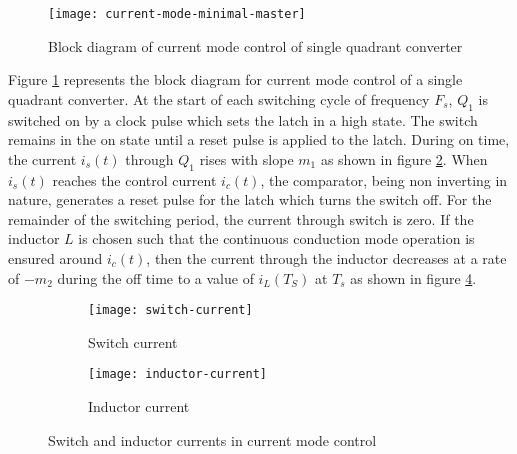 	\begin{figure}[h]
		\centering
		\texttt{[image: current-mode-minimal-master]}
		\caption{Block diagram of current mode control of single quadrant converter}
		\label{fig:16}
	\end{figure}

	Figure \ref{fig:16} represents the block diagram for current mode control of a single quadrant converter. At the start of each switching cycle of frequency $F_s$, $Q_1$ is switched on by a clock pulse which sets the latch in a high state. The switch remains in the on state until a reset pulse is applied to the latch. During on time, the current $i_s(t)$ through $Q_1$ rises with slope $m_1$ as shown in figure \ref{fig:17}. When $i_s(t)$ reaches the control current $i_c(t)$, the comparator, being non inverting in nature, generates a reset pulse for the latch which turns the switch off. For the remainder of the switching period, the current through switch is zero. If the inductor $L$ is chosen such that the continuous conduction mode operation is ensured around $i_c(t)$, then the current through the inductor decreases at a rate of $-m_2$ during the off time to a value of $i_L(T_S)$ at $T_s$ as shown in figure \ref{fig:18}.

	\begin{figure}[h]
	\begin{subfigure}{0.49\textwidth}
		\centering
		\texttt{[image: switch-current]}
		\caption{Switch current}
		\label{fig:17}
	\end{subfigure}
	\begin{subfigure}{0.49\textwidth}
		\centering
		\texttt{[image: inductor-current]}
		\caption{Inductor current}
		\label{fig:18}
	\end{subfigure}
	\caption{Switch and inductor currents in current mode control}
	\end{figure}

